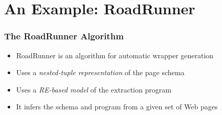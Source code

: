 \documentclass[svgnames]{beamer}
\begin{document}
\section{An Example: RoadRunner}

\begin{frame}
    \frametitle{The RoadRunner Algorithm}
    
    \begin{itemize}
    \item RoadRunner is an algorithm for automatic wrapper generation
    \item Uses a \emph{nested-tuple representation} of the page schema
    \item Uses a \emph{RE-based model} of the extraction program
    \item It infers the schema and program from a given set of Web pages
    \end{itemize}

\end{frame}


\newcommand{\pc}{\ensuremath{\#pcdata}}

    

\end{document}
